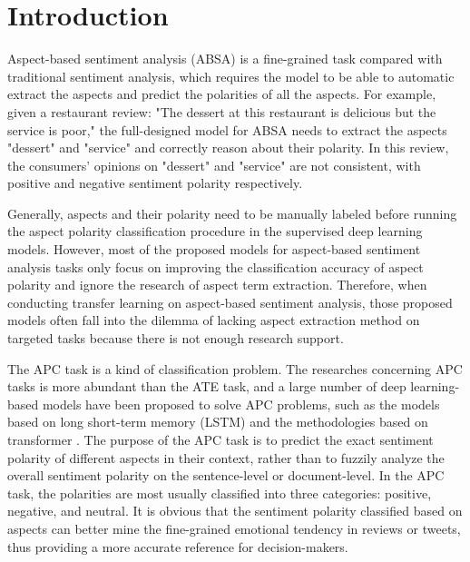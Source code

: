 \documentclass[a4paper,fleqn]{cas-sc}
\begin{document}
\maketitle

\section{Introduction}
Aspect-based sentiment analysis \cite{pontiki2014semeval, pontiki2015semeval, pontiki2016semeval} (ABSA) is a fine-grained task compared with traditional sentiment analysis, which requires the model to be able to automatic extract the aspects and predict the polarities of all the aspects. For example, given a restaurant review: "The dessert at this restaurant is delicious but the service is poor," the full-designed model for ABSA needs to extract the aspects "dessert" and "service" and correctly reason about their polarity. 
In this review, the consumers' opinions on "dessert" and "service" are not consistent, with positive and negative sentiment polarity respectively. 

Generally, aspects and their polarity need to be manually labeled before running the aspect polarity classification procedure in the supervised deep learning models. However, most of the proposed models for aspect-based sentiment analysis tasks only focus on improving the classification accuracy of aspect polarity and ignore the research of aspect term extraction. Therefore, when conducting transfer learning on aspect-based sentiment analysis, those proposed models often fall into the dilemma of lacking aspect extraction method on targeted tasks because there is not enough research support. 

The APC task is a kind of classification problem. The researches concerning APC tasks is more abundant than the ATE task, and a large number of deep learning-based models have been proposed to solve APC problems, such as the models \cite{vo2015target, wagner2014dcu, tang2016effective, wang2016attention, ma2017interactive, fan2018multi} based on long short-term memory (LSTM) and the methodologies \cite{song2019attentional, zeng2019lcf} based on transformer \cite{vaswani2017attention}. The purpose of the APC task is to predict the exact sentiment polarity of different aspects in their context, rather than to fuzzily analyze the overall sentiment polarity on the sentence-level or document-level. In the APC task, the polarities are most usually classified into three categories: positive, negative, and neutral. It is obvious that the sentiment polarity classified based on aspects can better mine the fine-grained emotional tendency in reviews or tweets, thus providing a more accurate reference for decision-makers. 
\end{document}
